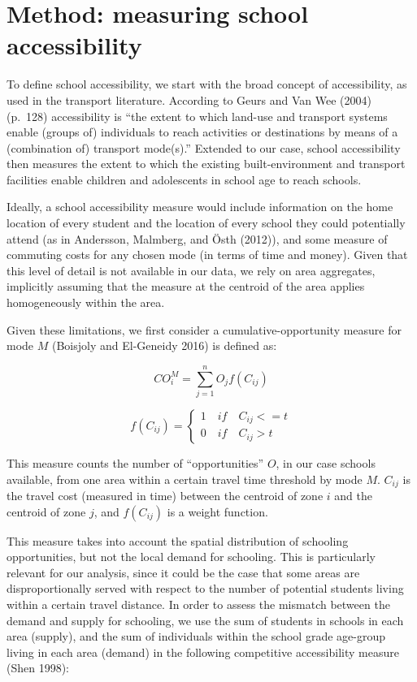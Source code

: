 \documentclass[3p,authoryear,preprint,review,12pt]{elsarticle}
\begin{document}
\section{Method: measuring school
accessibility}\label{method-measuring-school-accessibility}

To define school accessibility, we start with the broad concept of
accessibility, as used in the transport literature. According to Geurs and Van Wee (2004) (p.~128) accessibility is ``the extent to which land-use and transport systems enable (groups of) individuals to reach activities or destinations by means of a (combination of) transport mode(s).'' Extended to our case, school accessibility then measures the extent to which the existing built-environment and transport facilities enable children and adolescents in school age to reach schools.

Ideally, a school accessibility measure would include information on the home location of every student and the location of every school they could potentially attend (as in Andersson, Malmberg, and {Ö}sth (2012)), and some measure of commuting costs for any chosen mode (in terms of time and money). Given that this level of detail is not available in our data, we rely on area aggregates, implicitly assuming that the measure at the centroid of the area applies homogeneously within the area.

Given these limitations, we first consider a cumulative-opportunity
measure for mode \(M\) (Boisjoly and El-Geneidy 2016) is defined as:

\[ CO_{i}^M= \sum_{j=1}^nO_{j}f(C_{ij}) \]

\[ f(C_{ij}) = \left\{ 
                \begin{array}{ll}
                  1\quad if\quad C_{ij}<=t\\
                  0\quad if\quad C_{ij}>t
                \end{array}
              \right.
\]

This measure counts the number of ``opportunities'' \(O\), in our case schools available, from one area within a certain travel time threshold by mode \(M\). \(C_{ij}\) is the travel cost (measured in time) between the centroid of zone \(i\) and the centroid of zone \(j\), and \(f(C_{ij})\) is a weight function.

This measure takes into account the spatial distribution of schooling opportunities, but not the local demand for schooling. This is particularly relevant for our analysis, since it could be the case that some areas are disproportionally served with respect to the number of potential students living within a certain travel distance. In order to assess the mismatch between the demand and supply for schooling, we use the sum of students in schools in each area (supply), and the sum of individuals within the school grade age-group living in each area (demand) in the following competitive accessibility measure (Shen 1998):
\end{document}
